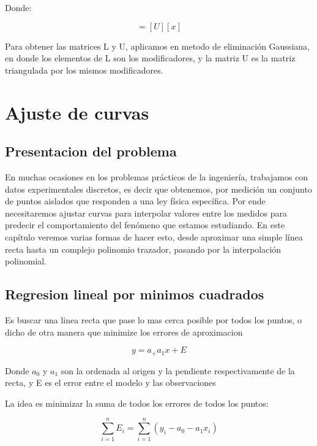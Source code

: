 \documentclass[10pt]{article}
\begin{document}
Donde:

\begin{equation}
	[y] = [U][x]
\end{equation}

Para obtener las matrices L y U, aplicamos en metodo de eliminación Gaussiana,
en donde los elementos de L son los modificadores, y la matriz
U es la matriz triangulada por los mismos modificadores.


\pagebreak

\section{Ajuste de curvas}

\subsection{Presentacion del problema}

En muchas ocasiones en los problemas prácticos de la ingeniería, trabajamos con
datos experimentales discretos, es decir que obtenemos, por medición un conjunto de
puntos aislados que responden a una ley física específica. Por ende necesitaremos ajustar
curvas para interpolar valores entre los medidos para predecir el comportamiento del
fenómeno que estamos estudiando.
En este capítulo veremos varias formas de hacer esto, desde aproximar una simple
línea recta hasta un complejo polinomio trazador, pasando por la interpolación
polinomial.

\subsection{Regresion lineal por minimos cuadrados}

Es buscar una linea recta que pase lo mas cerca posible por todos los puntos, 
o dicho de otra manera que minimize los errores de aproximacion

\begin{equation}
	y = a_ + a_1x + E
\end{equation}

Donde $a_0$ y $a_1$ son la ordenada al origen y la pendiente respectivamente de la recta, 
y E es el error entre el modelo y las observaciones

La idea es minimizar la suma de todos los errores de todos los puntos:

\begin{equation}
	\sum_{i=1}^n E_i = \sum_{i=1}^n (y_i-a_0 - a_1x_i)
\end{equation}
\end{document}
